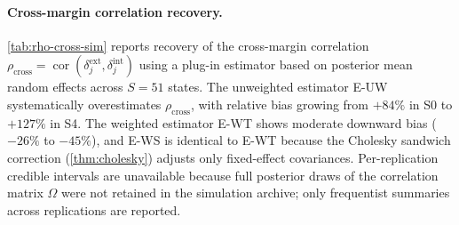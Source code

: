 {\small

}

\paragraph{Cross-margin correlation recovery.}
\cref{tab:rho-cross-sim} reports recovery of the cross-margin
correlation $\rho_{\mathrm{cross}} = \operatorname{cor}(\delta_j^{\mathrm{ext}},
\delta_j^{\mathrm{int}})$ using a plug-in estimator based on posterior
mean random effects across $S = 51$ states.
The unweighted estimator E-UW systematically overestimates
$\rho_{\mathrm{cross}}$, with relative bias growing from $+84\%$ in
S0 to $+127\%$ in S4.
The weighted estimator E-WT shows moderate downward bias ($-26\%$ to
$-45\%$), and E-WS is identical to E-WT because the Cholesky sandwich
correction (\cref{thm:cholesky}) adjusts only fixed-effect covariances.
Per-replication credible intervals are unavailable because full
posterior draws of the correlation matrix $\Omega$ were not retained
in the simulation archive; only frequentist summaries across
replications are reported.

{\small

}
